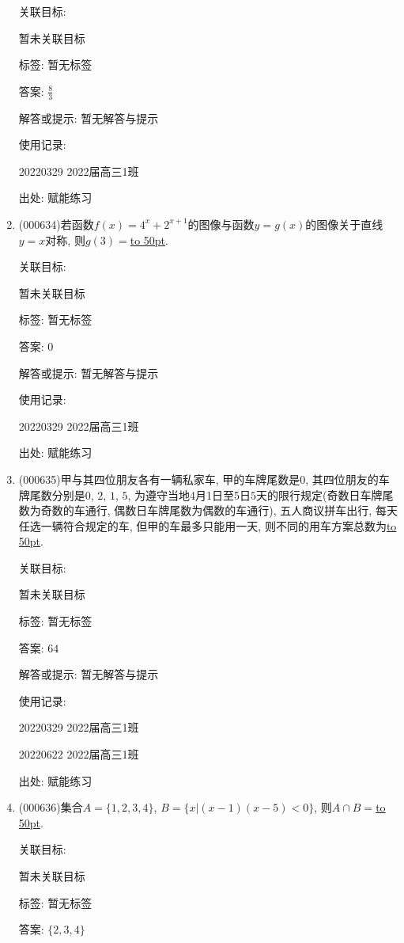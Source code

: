 \documentclass[10pt,a4paper]{article}
\newcommand{\blank}[1]{\underline{\hbox to #1pt{}}}
\begin{document}
\begin{enumerate}[1.]
关联目标:

暂未关联目标



标签: 暂无标签

答案: $\frac 83$

解答或提示: 暂无解答与提示

使用记录:

20220329	2022届高三1班	


出处: 赋能练习
\item { (000634)}若函数$f(x)=4^x+2^{x+1}$的图像与函数$y=g(x)$的图像关于直线$y=x$对称, 则$g(3)=$\blank{50}.


关联目标:

暂未关联目标



标签: 暂无标签

答案: $0$

解答或提示: 暂无解答与提示

使用记录:

20220329	2022届高三1班	


出处: 赋能练习
\item { (000635)}甲与其四位朋友各有一辆私家车, 甲的车牌尾数是$0$, 其四位朋友的车牌尾数分别是$0$, $2$, $1$, $5$, 为遵守当地4月1日至5日$5$天的限行规定(奇数日车牌尾数为奇数的车通行, 偶数日车牌尾数为偶数的车通行), 五人商议拼车出行, 每天任选一辆符合规定的车, 但甲的车最多只能用一天, 则不同的用车方案总数为\blank{50}.


关联目标:

暂未关联目标



标签: 暂无标签

答案: $64$

解答或提示: 暂无解答与提示

使用记录:

20220329	2022届高三1班	

20220622	2022届高三1班  	


出处: 赋能练习
\item { (000636)}集合$A=\{1,2,3,4\}$, $B=\{x|(x-1)(x-5)<0\}$, 则$A\cap B=$\blank{50}.


关联目标:

暂未关联目标



标签: 暂无标签

答案: $\{2,3,4\}$


\end{enumerate}
\end{document}
